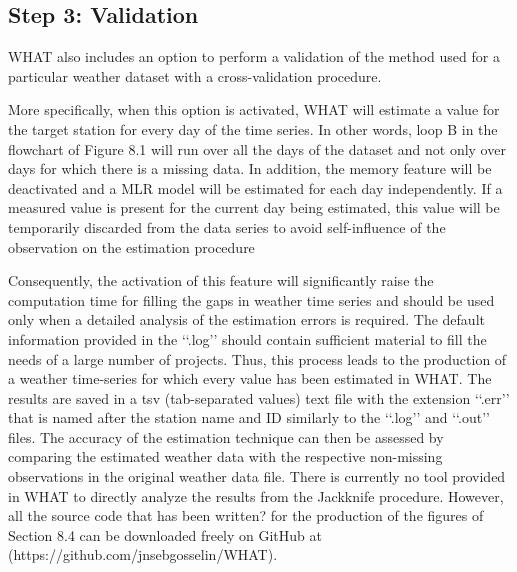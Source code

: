 \documentclass[TechnicalNoteMeteo.tex]{subfiles}
\begin{document}
\subsection{Step 3: Validation}

WHAT also includes an option to perform a validation of the method used for a particular weather dataset with a cross-validation procedure.

More specifically, when this option is activated, WHAT will estimate a value for the target station for every day of the time series. In other words, loop B in the flowchart of Figure 8.1 will run over all the days of the dataset and not only over days for which there is a missing data. In addition, the memory feature will be deactivated and a MLR model will be estimated for each day independently. If a measured value is present for the current day being estimated, this value will be temporarily discarded from the data series to avoid self-influence of the observation on the estimation procedure

Consequently, the activation of this feature will significantly raise the computation time for filling the gaps in weather time series and should be used only when a detailed analysis of the estimation errors is required. The default information provided in the ‘‘.log’’ should contain sufficient material to fill the needs of a large number of projects. Thus, this process leads to the production of a weather time-series for which every value has been estimated in WHAT. The results are saved in a tsv (tab-separated values) text file with the extension ‘‘.err’’ that is named after the station name and ID similarly to the ‘‘.log’’ and ‘‘.out’’ files.
The accuracy of the estimation technique can then be assessed by comparing the estimated weather data with the respective non-missing observations in the original weather data file. There is currently no tool provided in WHAT to directly analyze the results from the Jackknife procedure. However, all the source code that has been written? for the production of the figures of Section 8.4 can be downloaded freely on GitHub at (https://github.com/jnsebgosselin/WHAT).
\end{document}
